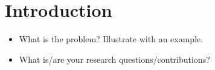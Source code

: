 \section{Introduction}
\begin{itemize}
    \item What is the problem? Illustrate with an example.
    \item What is/are your research questions/contributions?
\end{itemize}
